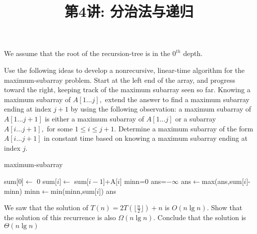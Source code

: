 \documentclass[a4paper, justified]{tufte-handout}
\title{第4讲: 分治法与递归}
\date{\zhtoday} %
\begin{document}
\maketitle
\noplagiarism %
\begin{abstract}
\end{abstract}
\beginrequired
We assume that the root of the recursion-tree is in the $0^{th}$ depth.
\begin{problem}[TC 4.1-5]
Use the following ideas to develop a nonrecursive, linear-time algorithm for the maximum-subarray problem. Start at the left end of the array, and progress toward the right, keeping track of the maximum subarray seen so far. Knowing a maximum subarray of $A[1 \ldots j],$ extend the answer to find a maximum subarray ending at index $j+1$ by using the following observation: a maximum subarray of $A[1 \ldots j+1]$
is either a maximum subarray of $A[1 \ldots j]$ or a subarray $A[i \ldots j+1],$ for some $1 \leq i \leq j+1 .$ Determine a maximum subarray of the form $A[i \ldots j+1]$ in constant time based on knowing a maximum subarray ending at index $j$.
\end{problem}

\begin{solution}
\noindent
\begin{algorithm}
\caption{ maximum-subarray}\label{euclid}
\begin{algorithmic}[1]
\State sum[$0$]$\gets $ 0 
	\State sum[$i$]$\gets$ sum[$i-1$]+A[$i$]
\EndFor
\State minn=$0$
\State ans=$-\infty$
\State ans$\gets$max(ans,sum[$i$]-minn)
\State minn$\gets$min(minn,sum[$i$])
\EndFor 
\State \Return ans 
\EndProcedure
\end{algorithmic}
\end{algorithm}

\end{solution}

\begin{problem}[TC 4.3-3]
We saw that the solution of $T(n)=2 T(\lfloor \frac{n}{2}\rfloor)+n$ is $O(n \lg n) .$ Show that the solution of this recurrence is also $\Omega(n \lg n) .$ Conclude that the solution is $\Theta(n \lg n)$
\end{problem}
\end{document}
